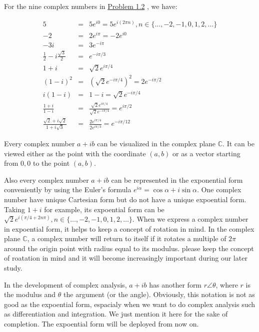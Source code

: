 \documentclass[koma,a4paper,utopia,12pt,listings-color,microtype,paralist,colorlinks,urlcolor=red]{org-article}
\begin{document}
For the nine complex numbers in  \hyperref[prob12]{Problem 1.2} , we have:

\begin{eqnarray*}
 5 &=& 5 e^{i0} = 5 e^{i(2\pi n)}, n\in \{\ldots, -2,-1,0,1,2,\ldots \} \\
 -2 &=& 2 e^{i\pi} = -2 e^{i0} \\
 -3i &=& 3 e^{-i\pi} \\
 \tfrac{1}{2} - i \tfrac{\sqrt{3}}{2}  &=& e^{-i\pi/3} \\
 1+i &=& \sqrt{2} e^{i\pi/4} \\
 (1-i)^{2} &=& ( \sqrt{2} e^{-i\pi/4} )^{2} = 2 e^{-i\pi/2} \\
 i(1-i) &=& 1 - i = \sqrt{2} e^{-i\pi/4} \\
 \tfrac{1+i}{1-i} &=& \tfrac{ \sqrt{2}e^{i\pi/4} } { \sqrt{2}e^{-i\pi/4} } = e^{i\pi/2} \\
 \tfrac{\sqrt{2} + i \sqrt{2}}{1+i\sqrt{3}} &=& \tfrac{ 2e^{i\pi/4} }{ 2 e^{i\pi/3} } = e^{-i\pi/12}
\end{eqnarray*}


Every complex number \(a+ib\) can be visualized in the complex plane
\(\mathbb{C}\). It can be viewed either as the point with the coordinate
\((a,b)\) or as a vector starting from \(0,0\) to the point \((a,b)\).

Also every complex number \(a+ib\) can be represented in the exponential form
conveniently by using the Euler's formula \(e^{i\alpha} = \cos\alpha +
i\sin\alpha\). One complex number have unique Cartesian form but do not have a
unique expoential form. Taking \(1+i\) for example, its expoential form can be
\(\sqrt{2}e^{i(\pi/4 + 2n\pi)}, n\in \{ \ldots, -2,-1,0,1,2,\ldots \}\). When we
express a complex number in expoential form, it helps to keep a concept of
rotation in mind. In the complex plane \(\mathbb{C}\), a complex number will
return to itself if it rotates a multiple of \(2\pi\) around the origin point
with radius equal to its modulus. please keep the concept of roatation in mind
and it will become increasingly important during our later study.

In the development of complex analysis, \(a+ib\) has another form \(r\angle
\theta\), where \(r\) is the modulus and \(\theta\) the argument (or the angle).
Obviously, this notation is not as good as the expoential form, espacialy when
we want to do complex analysis such as differentiation and integration. We just
mention it here for the sake of completion. The expoential form will be deployed
from now on.
\end{document}
